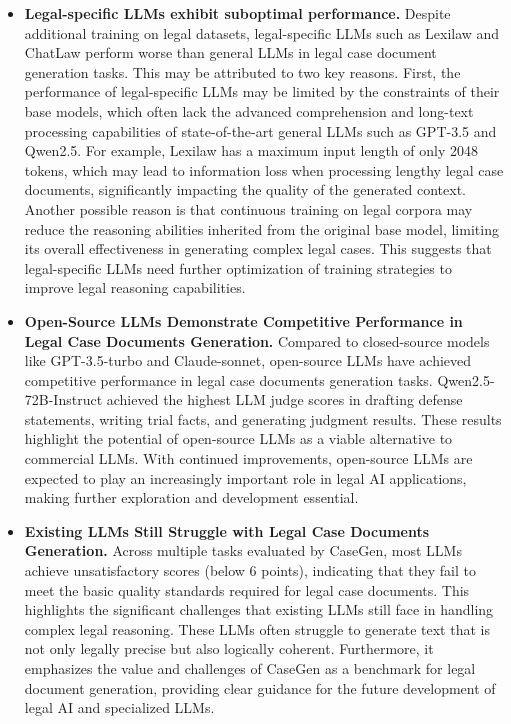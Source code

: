 \begin{itemize}[leftmargin=*]
\item \textbf{Legal-specific LLMs exhibit suboptimal performance.}
Despite additional training on legal datasets, legal-specific LLMs such as Lexilaw and ChatLaw perform worse than general LLMs in legal case document generation tasks. 
This may be attributed to two key reasons.
First, the performance of legal-specific LLMs may be limited by the constraints of their base models, which often lack the advanced comprehension and long-text processing capabilities of state-of-the-art general LLMs such as GPT-3.5 and Qwen2.5. For example, Lexilaw has a maximum input length of only 2048 tokens, which may lead to information loss when processing lengthy legal case documents, significantly impacting the quality of the generated context.
Another possible reason is that continuous training on legal corpora may reduce the reasoning abilities inherited from the original base model, limiting its overall effectiveness in generating complex legal cases.
This suggests that legal-specific LLMs need further optimization of training strategies to improve legal reasoning capabilities.




\item \textbf{Open-Source LLMs Demonstrate Competitive Performance in Legal Case Documents Generation.}
Compared to closed-source models like GPT-3.5-turbo and Claude-sonnet, open-source LLMs have achieved competitive performance in legal case documents generation tasks.
Qwen2.5-72B-Instruct achieved the highest LLM judge scores in drafting defense statements, writing trial facts, and generating judgment results.
These results highlight the potential of open-source LLMs as a viable alternative to commercial LLMs.
With continued improvements, open-source LLMs are expected to play an increasingly important role in legal AI applications, making further exploration and development essential.




\item \textbf{Existing LLMs Still Struggle with Legal Case Documents Generation.}
Across multiple tasks evaluated by CaseGen,  most LLMs achieve unsatisfactory scores (below 6 points), indicating that they fail to meet the basic quality standards required for legal case documents. 
This highlights the significant challenges that existing LLMs still face in handling complex legal reasoning.
These LLMs often struggle to generate text that is not only legally precise but also logically coherent. 
Furthermore, it emphasizes the value and challenges of CaseGen as a benchmark for legal document generation, providing clear guidance for the future development of legal AI and specialized LLMs.

\end{itemize}






